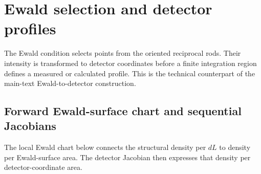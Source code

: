 \section{Ewald selection and detector profiles}
\label{sec:si_detector_profiles}

The Ewald condition selects points from the oriented reciprocal rods. Their intensity is transformed to detector coordinates before a finite integration region defines a measured or calculated profile. This is the technical counterpart of the main-text Ewald-to-detector construction.

\subsection{Forward Ewald-surface chart and sequential Jacobians}
\label{subsec:si_ewald_surface_chart}

The local Ewald chart below connects the structural density per $dL$ to density per Ewald-surface area. The detector Jacobian then expresses that density per detector-coordinate area.

